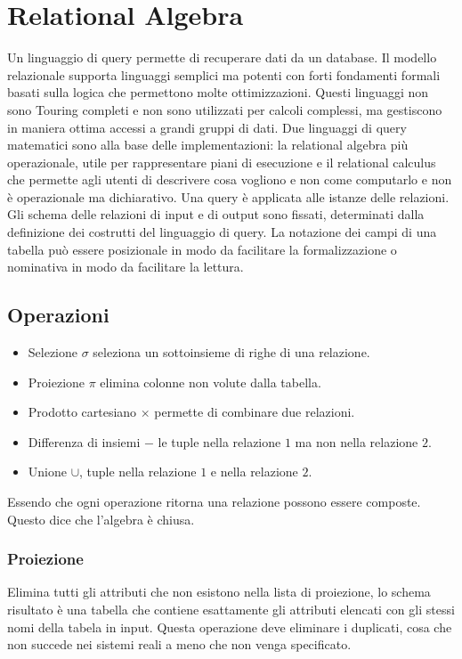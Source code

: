 \chapter{Relational Algebra}
Un linguaggio di query permette di recuperare dati da un database. Il modello relazionale supporta linguaggi semplici ma potenti con forti fondamenti formali
basati sulla logica che permettono molte ottimizzazioni. Questi linguaggi non sono Touring completi e non sono utilizzati per calcoli complessi, ma 
gestiscono in maniera ottima accessi a grandi gruppi di dati. Due linguaggi di query matematici sono alla base delle implementazioni: la relational algebra
pi\`u operazionale, utile per rappresentare piani di esecuzione e il relational calculus che permette agli utenti di descrivere cosa vogliono e non come
computarlo e non \`e operazionale ma dichiarativo. Una query \`e applicata alle istanze delle relazioni. Gli schema delle relazioni di input e di output 
sono fissati, determinati dalla definizione dei costrutti del linguaggio di query. La notazione dei campi di una tabella pu\`o essere posizionale in modo 
da facilitare la formalizzazione o nominativa in modo da facilitare la lettura. 
\section{Operazioni}
\begin{itemize}
\item Selezione $\sigma$ seleziona un sottoinsieme di righe di una relazione.
\item Proiezione $\pi$ elimina colonne non volute dalla tabella.
\item Prodotto cartesiano $\times$ permette di combinare due relazioni.
\item Differenza di insiemi $-$ le tuple nella relazione $1$ ma non nella relazione $2$.
\item Unione $\cup$, tuple nella relazione $1$ e nella relazione $2$.
\end{itemize}
Essendo che ogni operazione ritorna una relazione possono essere composte. Questo dice che l'algebra \`e chiusa. 
\subsection{Proiezione}
Elimina tutti gli attributi che non esistono nella lista di proiezione, lo schema risultato \`e una tabella che contiene esattamente gli attributi elencati
con gli stessi nomi della tabela in input. Questa operazione deve eliminare i duplicati, cosa che non succede nei sistemi reali a meno che non venga 
specificato. 
